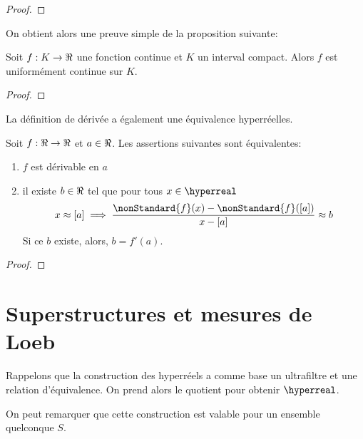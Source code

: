 \documentclass[a4paper, 12pt]{report}
\begin{document}
\ifdefined\outputproof
\begin{proof}

\end{proof}
\fi

On obtient alors une preuve simple de la proposition suivante:

\begin{proposition}
	Soit $f : K \rightarrow \real$ une fonction continue et $K$ un interval compact.
	Alors $f$ est uniformément continue sur $K$.
\end{proposition}

\ifdefined\outputproof
\begin{proof}

\end{proof}
\fi

La définition de dérivée a également une équivalence hyperréelles.

\begin{proposition}
	Soit $f : \real \rightarrow \real$ et $a \in \real$. Les assertions
	suivantes sont équivalentes:

	\begin{enumerate}
		\item $f$ est dérivable en $a$
		\item il existe $b \in \real$ tel que pour tous $x \in \hyperreal$
			\begin{equation}
				x \approx [a] \implies \frac{\nonStandard{f}(x) -
				\nonStandard{f}([a])}{x - [a]} \approx b
			\end{equation}
			Si ce $b$ existe, alors, $b = f'(a)$.
	\end{enumerate}
\end{proposition}

\ifdefined\outputproof
\begin{proof}

\end{proof}
\fi


\chapter{Superstructures et mesures de Loeb}

Rappelons que la construction des hyperréels a comme base un ultrafiltre et une
relation d'équivalence. On prend alors le quotient pour obtenir $\hyperreal$.

On peut remarquer que cette construction est valable pour un ensemble quelconque
$S$.
\end{document}

